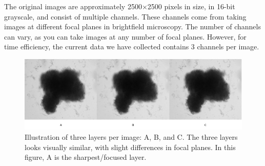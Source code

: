 \documentclass[12pt,twoside,a4paper,parskip]{scrbook} %
\begin{document}
The original images are approximately 2500×2500 pixels in size, in 16-bit grayscale, and consist of multiple channels. These channels come from taking images at different focal planes in brightfield microscopy. The number of channels can vary, as you can take images at any number of focal planes. However, for time efficiency, the current data we have collected contains 3 channels per image.

\begin{figure}[H]
  \centering
  \includegraphics[scale=0.46]{figures/threes.png} 
  \caption{Illustration of three layers per image: A, B, and C. The three layers looks visually similar, with slight differences in focal planes. In this figure, A is the sharpest/focused layer.}
  \label{fig:Threes}
\end{figure}
\end{document}
